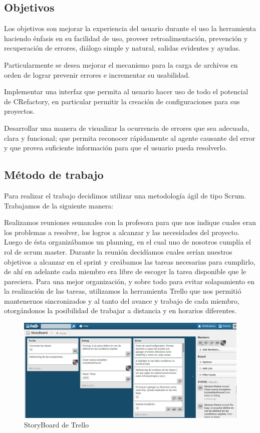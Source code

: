 \documentclass[a4paper,oneside,12pt]{article}
\begin{document}
\subsection{Objetivos}

Los objetivos son mejorar la experiencia del usuario durante el uso la herramienta haciendo \'enfasis en su facilidad de uso, proveer retroalimentaci\'on, prevenci\'on y recuperaci\'on de errores, di\'alogo simple y natural, salidas evidentes y ayudas.

Particularmente se desea mejorar el mecanismo para la carga de archivos en orden de lograr prevenir errores e incrementar su usabilidad.

Implementar una interfaz que permita al usuario hacer uso de todo el potencial de CRefactory, en particular permitir la creaci\'on de configuraciones para sus proyectos.

Desarrollar una manera de visualizar la ocurrencia de errores que sea adecuada, clara y funcional; que permita reconocer r\'apidamente al agente causante del error y que provea suficiente informaci\'on para que el usuario pueda resolverlo.

\subsection{M\'etodo de trabajo}

Para realizar el trabajo decidimos utilizar una metodolog\'ia \'agil de tipo Scrum. Trabajamos de la siguiente manera: 

Realizamos reuniones semanales con la profesora para que nos indique cuales eran los problemas a resolver, los logros a alcanzar y las necesidades del proyecto. Luego de \'esta organiz\'abamos un planning, en el cual uno de nosotros cumpl\'ia el rol de scrum master. Durante la reuni\'on decid\'iamos cuales ser\'ian nuestros objetivos a alcanzar en el sprint y cre\'abamos las tareas necesarias para cumplirlo, de ah\'i en adelante cada miembro era libre de escoger la tarea disponible que le pareciera. Para una mejor organizaci\'on, y sobre todo para evitar solapamiento en la realizaci\'on de las tareas, utilizamos la herramienta Trello que nos permiti\'o mantenernos sincronizados y al tanto del avance y trabajo de cada miembro, otorg\'andonos la posibilidad de trabajar a distancia y en horarios diferentes.

\begin{figure}[h!]
  \centering
    \includegraphics[scale=0.27]{images/trello.png}
    \caption{StoryBoard de Trello}
    \label{trello}
\end{figure}
\end{document}
